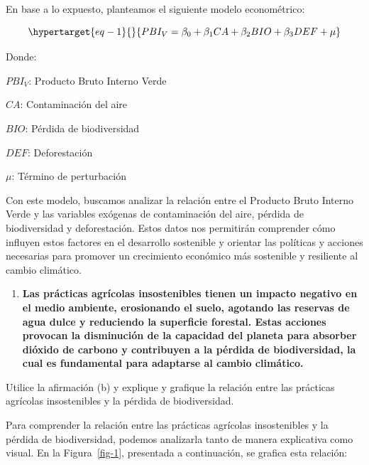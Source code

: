 \documentclass[
  letterpaper,
  DIV=11,
  numbers=noendperiod]{scrartcl}
\providecommand{\tightlist}{%
  \setlength{\itemsep}{0pt}\setlength{\parskip}{0pt}}\usepackage{longtable,booktabs,array}
\begin{document}
En base a lo expuesto, planteamos el siguiente modelo econométrico:

\begin{equation}\protect\hypertarget{eq-1}{}{
PBI_{V} = \beta_{0} + \beta_{1}CA + \beta_{2}BIO + \beta_{3}DEF + \mu
}\label{eq-1}\end{equation}

Donde:

\(PBI_{V}\): Producto Bruto Interno Verde

\(CA\): Contaminación del aire

\(BIO\): Pérdida de biodiversidad

\(DEF\): Deforestación

\(μ\): Término de perturbación

Con este modelo, buscamos analizar la relación entre el Producto Bruto
Interno Verde y las variables exógenas de contaminación del aire,
pérdida de biodiversidad y deforestación. Estos datos nos permitirán
comprender cómo influyen estos factores en el desarrollo sostenible y
orientar las políticas y acciones necesarias para promover un
crecimiento económico más sostenible y resiliente al cambio climático.

\begin{enumerate}
\def\labelenumi{\alph{enumi}.}
\setcounter{enumi}{1}
\tightlist
\item
  \textbf{Las prácticas agrícolas insostenibles tienen un impacto
  negativo en el medio ambiente, erosionando el suelo, agotando las
  reservas de agua dulce y reduciendo la superficie forestal. Estas
  acciones provocan la disminución de la capacidad del planeta para
  absorber dióxido de carbono y contribuyen a la pérdida de
  biodiversidad, la cual es fundamental para adaptarse al cambio
  climático.}
\end{enumerate}

Utilice la afirmación (b) y explique y grafique la relación entre las
prácticas agrícolas insostenibles y la pérdida de biodiversidad.

Para comprender la relación entre las prácticas agrícolas insostenibles
y la pérdida de biodiversidad, podemos analizarla tanto de manera
explicativa como visual. En la Figura~\ref{fig-1}, presentada a
continuación, se grafica esta relación:
\end{document}

